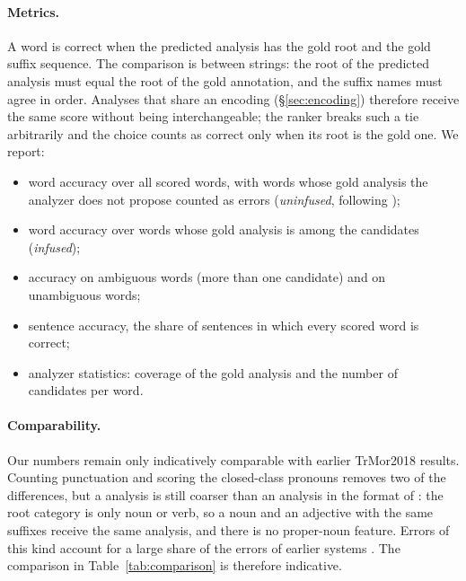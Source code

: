 \paragraph{Metrics.}
A word is correct when the predicted analysis has the gold root and the gold suffix sequence. The comparison is between strings: the root of the predicted analysis must equal the root of the gold annotation, and the suffix names must agree in order. Analyses that share an encoding (\S\ref{sec:encoding}) therefore receive the same score without being interchangeable; the ranker breaks such a tie arbitrarily and the choice counts as correct only when its root is the gold one. We report:
\begin{itemize}
\item word accuracy over all scored words, with words whose gold analysis the analyzer does not propose counted as errors (\emph{uninfused}, following \citealp{seker-tsarfaty-2020-pointer});
\item word accuracy over words whose gold analysis is among the candidates (\emph{infused});
\item accuracy on ambiguous words (more than one candidate) and on unambiguous words;
\item sentence accuracy, the share of sentences in which every scored word is correct;
\item analyzer statistics: coverage of the gold analysis and the number of candidates per word.
\end{itemize}

\paragraph{Comparability.}
Our numbers remain only indicatively comparable with earlier TrMor2018 results. Counting punctuation and scoring the closed-class pronouns removes two of the differences, but a \savyar{} analysis is still coarser than an analysis in the format of \citet{oflazer-1994-two}: the root category is only noun or verb, so a noun and an adjective with the same suffixes receive the same analysis, and there is no proper-noun feature. Errors of this kind account for a large share of the errors of earlier systems \citep{yildiz-etal-2016-morphology,ozer-korkmaz-2022-transmorph}. The comparison in Table~\ref{tab:comparison} is therefore indicative.

